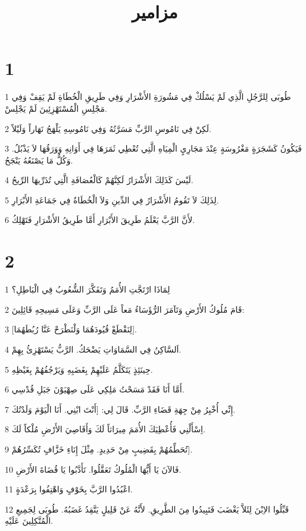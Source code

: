 

\title{مزامير}


\chapter{1}

\par 1 طُوبَى لِلرَّجُلِ الَّذِي لَمْ يَسْلُكْ فِي مَشُورَةِ الأَشْرَارِ وَفِي طَرِيقِ الْخُطَاةِ لَمْ يَقِفْ وَفِي مَجْلِسِ الْمُسْتَهْزِئِينَ لَمْ يَجْلِسْ.
\par 2 لَكِنْ فِي نَامُوسِ الرَّبِّ مَسَرَّتُهُ وَفِي نَامُوسِهِ يَلْهَجُ نَهَاراً وَلَيْلاً.
\par 3 فَيَكُونُ كَشَجَرَةٍ مَغْرُوسَةٍ عِنْدَ مَجَارِيِِ الْمِيَاهِ الَّتِي تُعْطِي ثَمَرَهَا فِي أَوَانِهِ وَوَرَقُهَا لاَ يَذْبُلُ. وَكُلُّ مَا يَصْنَعُهُ يَنْجَحُ.
\par 4 لَيْسَ كَذَلِكَ الأَشْرَارُ لَكِنَّهُمْ كَالْعُصَافَةِ الَّتِي تُذَرِّيهَا الرِّيحُ.
\par 5 لِذَلِكَ لاَ تَقُومُ الأَشْرَارُ فِي الدِّينِ وَلاَ الْخُطَاةُ فِي جَمَاعَةِ الأَبْرَارِ.
\par 6 لأَنَّ الرَّبَّ يَعْلَمُ طَرِيقَ الأَبْرَارِ أَمَّا طَرِيقُ الأَشْرَارِ فَتَهْلِكُ.

\chapter{2}

\par 1 لِمَاذَا ارْتَجَّتِ الأُمَمُ وَتَفَكَّرَ الشُّعُوبُ فِي الْبَاطِلِ؟
\par 2 قَامَ مُلُوكُ الأَرْضِ وَتَآمَرَ الرُّؤَسَاءُ مَعاً عَلَى الرَّبِّ وَعَلَى مَسِيحِهِ قَائِلِينَ:
\par 3 [لِنَقْطَعْ قُيُودَهُمَا وَلْنَطْرَحْ عَنَّا رُبُطَهُمَا].
\par 4 اَلسَّاكِنُ فِي السَّمَاوَاتِ يَضْحَكُ. الرَّبُّ يَسْتَهْزِئُ بِهِمْ.
\par 5 حِينَئِذٍ يَتَكَلَّمُ عَلَيْهِمْ بِغَضَبِهِ وَيَرْجُفُهُمْ بِغَيْظِهِ.
\par 6 أَمَّا أَنَا فَقَدْ مَسَحْتُ مَلِكِي عَلَى صِهْيَوْنَ جَبَلِ قُدْسِي.
\par 7 إِنِّي أُخْبِرُ مِنْ جِهَةِ قَضَاءِ الرَّبِّ. قَالَ لِي: [أَنْتَ ابْنِي. أَنَا الْيَوْمَ وَلَدْتُكَ.
\par 8 اِسْأَلْنِي فَأُعْطِيَكَ الأُمَمَ مِيرَاثاً لَكَ وَأَقَاصِيَ الأَرْضِ مُلْكاً لَكَ.
\par 9 تُحَطِّمُهُمْ بِقَضِيبٍ مِنْ حَدِيدٍ. مِثْلَ إِنَاءِ خَزَّافٍ تُكَسِّرُهُمْ].
\par 10 فَالآنَ يَا أَيُّهَا الْمُلُوكُ تَعَقَّلُوا. تَأَدَّبُوا يَا قُضَاةَ الأَرْضِ.
\par 11 اعْبُدُوا الرَّبَّ بِخَوْفٍ وَاهْتِفُوا بِرَعْدَةٍ.
\par 12 قَبِّلُوا الاِبْنَ لِئَلاَّ يَغْضَبَ فَتَبِيدُوا مِنَ الطَّرِيقِ. لأَنَّهُ عَنْ قَلِيلٍ يَتَّقِدُ غَضَبُهُ. طُوبَى لِجَمِيعِ الْمُتَّكِلِينَ عَلَيْهِ.

